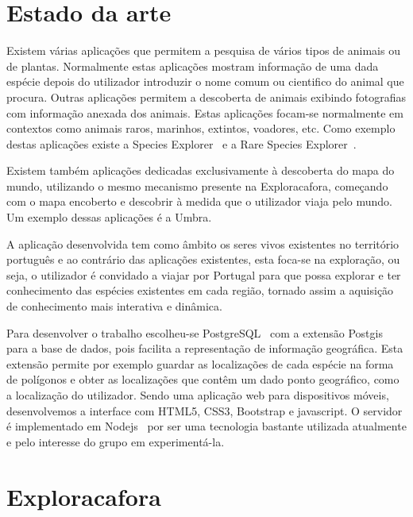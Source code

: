 \documentclass[twocolumn,twoside,11pt,a4paper]{article}
\begin{document}

\section{Estado da arte}\label{sec:sota}

Existem várias aplicações que permitem a pesquisa de vários tipos de animais ou de plantas. Normalmente estas aplicações mostram informação de uma dada espécie depois do utilizador introduzir o nome comum ou cientifico do animal que procura. Outras aplicações permitem a descoberta de animais exibindo fotografias com informação anexada dos animais. Estas aplicações focam-se normalmente em contextos como animais raros, marinhos, extintos, voadores, etc. Como exemplo destas aplicações existe a Species Explorer~\cite{speciesexplorer} e a Rare Species Explorer~\cite{rarespecies}.

Existem também aplicações dedicadas exclusivamente à descoberta do mapa do mundo, utilizando o mesmo mecanismo presente na Exploracafora, começando com o mapa encoberto e descobrir à medida que o utilizador viaja pelo mundo. Um exemplo dessas aplicações é a Umbra.~\cite{umbra}

A aplicação desenvolvida tem como âmbito os seres vivos existentes no território português e ao contrário das aplicações existentes, esta foca-se na exploração, ou seja, o utilizador é convidado a viajar por Portugal para que possa explorar e ter conhecimento das espécies existentes em cada região, tornado assim a aquisição de conhecimento mais interativa e dinâmica.

Para desenvolver o trabalho escolheu-se PostgreSQL~\cite{postgresql} com a extensão Postgis~\cite{postgis} para a base de dados, pois facilita a representação de informação geográfica. Esta extensão permite por exemplo guardar as localizações de cada espécie na forma de polígonos e obter as localizações que contêm um dado ponto geográfico, como a localização do utilizador. Sendo uma aplicação web para dispositivos móveis, desenvolvemos a interface com HTML5, CSS3, Bootstrap e javascript. O servidor é implementado em Nodejs~\cite{nodejs} por ser uma tecnologia bastante utilizada atualmente e pelo interesse do grupo em experimentá-la.


\section{Exploracafora}\label{sec:application}
\end{document}
